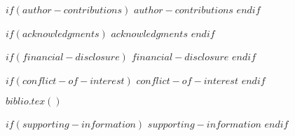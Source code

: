 $if(author-contributions)$
$author-contributions$
$endif$

$if(acknowledgments)$
$acknowledgments$
$endif$

$if(financial-disclosure)$
$financial-disclosure$
$endif$

$if(conflict-of-interest)$
$conflict-of-interest$
$endif$

$biblio.tex()$

$if(supporting-information)$
$supporting-information$
$endif$
